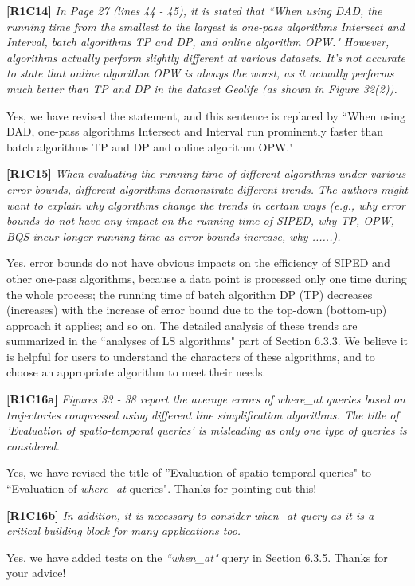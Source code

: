 \documentclass{letter}
\begin{document}
{\textbf{[R1C14]} \emph{ In Page 27 (lines 44 - 45), it is stated that ``When using DAD, the running time from the smallest to the largest is one-pass algorithms Intersect and Interval, batch algorithms TP and DP, and online algorithm OPW." However, algorithms actually perform slightly different at various datasets. It's not accurate to state that online algorithm OPW is always the worst, as it actually performs much better than TP and DP in the dataset Geolife (as shown in Figure 32(2)).}

Yes, we have revised the statement, and this sentence is replaced by ``When using DAD, one-pass algorithms Intersect and Interval run prominently faster than batch algorithms TP and DP and online algorithm OPW." 

\textbf{[R1C15]} \emph{ When evaluating the running time of different algorithms under various error bounds, different algorithms demonstrate different trends. The authors might want to explain why algorithms change the trends in certain ways (e.g., why error bounds do not have any impact on the running time of SIPED, why TP, OPW, BQS incur longer running time as error bounds increase, why ......).}

Yes, error bounds do not have obvious impacts on the efficiency of SIPED and other one-pass algorithms, because a data point is processed only one time during the whole process; the running time of batch algorithm DP (TP) decreases (increases) with the increase of error bound due to the top-down (bottom-up) approach it applies; and so on. The detailed analysis of these trends are summarized in the ``analyses of LS algorithms" part of Section 6.3.3. 
%
We believe it is helpful for users to understand the characters of these algorithms, and to choose an appropriate algorithm to meet their needs.

\textbf{[R1C16a]} \emph{ Figures 33 - 38 report the average errors of where\_at queries based on trajectories compressed using different line simplification algorithms. The title of 'Evaluation of spatio-temporal queries' is misleading as only one type of queries is considered.} 

Yes, we have revised the title of ''Evaluation of spatio-temporal queries" to ``Evaluation of \emph{where\_at} queries". Thanks for pointing out this!

\textbf{[R1C16b]} \emph{In addition, it is necessary to consider \emph{when\_at} query as it is a critical building block for many applications too.} 

Yes, we have added tests on the \emph{``when\_at"} query in Section 6.3.5. Thanks for your advice!

}
\end{document}
